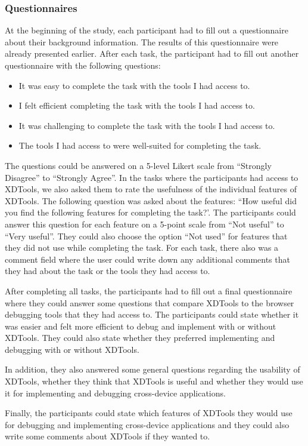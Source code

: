 \subsubsection{Questionnaires}
At the beginning of the study, each participant had to fill out a questionnaire about their background information. The results of this questionnaire were already presented earlier. After each task, the participant had to fill out another questionnaire with the following questions:
\begin{itemize}
	\item It was easy to complete the task with the tools I had access to.
	\item I felt efficient completing the task with the tools I had access to.
	\item It was challenging to complete the task with the tools I had access to.
	\item The tools I had access to were well-suited for completing the task.
\end{itemize}
The questions could be answered on a 5-level Likert scale from ``Strongly Disagree'' to ``Strongly Agree''. In the tasks where the participants had access to XDTools, we also asked them to rate the usefulness of the individual features of XDTools. The following question was asked about the features: ``How useful did you find the following features for completing the task?'. The participants could answer this question for each feature on a 5-point scale from ``Not useful'' to ``Very useful''. They could also choose the option ``Not used'' for features that they did not use while completing the task. For each task, there also was a comment field where the user could write down any additional comments that they had about the task or the tools they had access to.

After completing all tasks, the participants had to fill out a final questionnaire where they could answer some questions that compare XDTools to the browser debugging tools that they had access to. The participants could state whether it was easier and felt more efficient to debug and implement with or without XDTools. They could also state whether they preferred implementing and debugging with or without XDTools.

In addition, they also answered some general questions regarding the usability of XDTools, whether they think that XDTools is useful and whether they would use it for implementing and debugging cross-device applications. 

Finally, the participants could state which features of XDTools they would use for debugging and implementing cross-device applications and they could also write some comments about XDTools if they wanted to.

